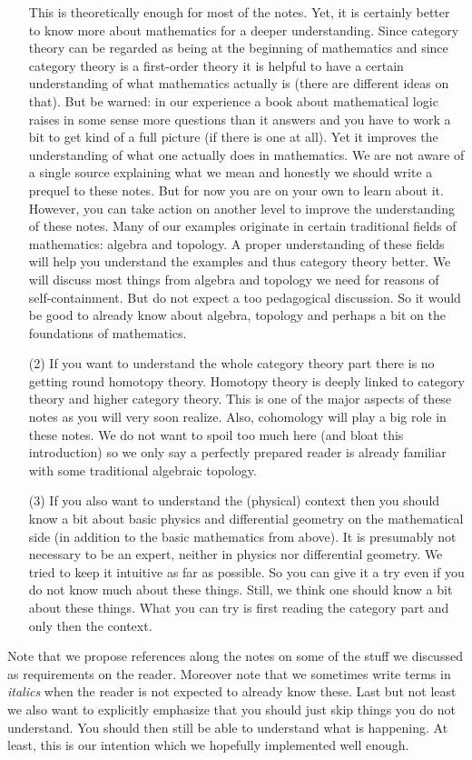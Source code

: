 \begin{enumerate}
This is theoretically enough for most of the notes. Yet, it is certainly better to know more about mathematics for a deeper understanding. Since category theory can be regarded as being at the beginning of mathematics and since category theory is a first-order theory it is helpful to have a certain understanding of what mathematics actually is (there are different ideas on that). But be warned: in our experience a book about mathematical logic raises in some sense more questions than it answers and you have to work a bit to get kind of a full picture (if there is one at all). Yet it improves the understanding of what one actually does in mathematics. We are not aware of a single source explaining what we mean and honestly we should write a prequel to these notes. But for now you are on your own to learn about it. However, you can take action on another level to improve the understanding of these notes. Many of our examples originate in certain traditional fields of mathematics: algebra and topology. A proper understanding of these fields will help you understand the examples and thus category theory better. We will discuss most things from algebra and topology we need for reasons of self-containment. But do not expect a too pedagogical discussion. So it would be good to already know about algebra, topology and perhaps a bit on the foundations of mathematics.
\item[(2)]
If you want to understand the whole category theory part there is no getting round homotopy theory. Homotopy theory is deeply linked to category theory and higher category theory. This is one of the major aspects of these notes as you will very soon realize. Also, cohomology will play a big role in these notes. We do not want to spoil too much here (and bloat this introduction) so we only say a perfectly prepared reader is already familiar with some traditional algebraic topology.
\item[(3)]
If you also want to understand the (physical) context then you should know a bit about basic physics and differential geometry on the mathematical side (in addition to the basic mathematics from above). It is presumably not necessary to be an expert, neither in physics nor differential geometry. We tried to keep it intuitive as far as possible. So you can give it a try even if you do not know much about these things. Still, we think one should know a bit about these things. What you can try is first reading the category part and only then the context.
\end{enumerate}
Note that we propose references along the notes on some of the stuff we discussed as requirements on the reader. Moreover note that we sometimes write terms in \textit{italics} when the reader is not expected to already know these. Last but not least we also want to explicitly emphasize that you should just skip things you do not understand. You should then still be able to understand what is happening. At least, this is our intention which we hopefully implemented well enough.
